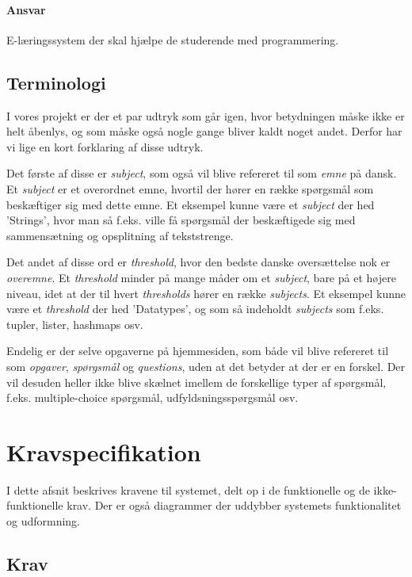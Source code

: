 \documentclass[11pt, a4paper]{article}
\begin{document}
\paragraph{Ansvar}
E-læringssystem der skal hjælpe de studerende med programmering.

\subsection{Terminologi}
\label{sub:terminologi}
I vores projekt er der et par udtryk som går igen, hvor betydningen måske ikke er helt åbenlys, og som måske også nogle gange bliver kaldt noget andet. Derfor har vi lige en kort forklaring af disse udtryk.

Det første af disse er \emph{subject}, som også vil blive refereret til som \emph{emne} på dansk. Et \emph{subject} er et overordnet emne, hvortil der hører en række spørgsmål som beskæftiger sig med dette emne. Et eksempel kunne være et \emph{subject} der hed 'Strings', hvor man så f.eks. ville få spørgsmål der beskæftigede sig med sammensætning og opsplitning af tekststrenge.

Det andet af disse ord er \emph{threshold}, hvor den bedste danske oversættelse nok er \emph{overemne}. Et \emph{threshold} minder på mange måder om et \emph{subject}, bare på et højere niveau, idet at der til hvert \emph{thresholds} hører en række \emph{subjects}. Et eksempel kunne være et \emph{threshold} der hed 'Datatypes', og som så indeholdt \emph{subjects} som f.eks. tupler, lister, hashmaps osv.

Endelig er der selve opgaverne på hjemmesiden, som både vil blive refereret til som \emph{opgaver}, \emph{spørgsmål} og \emph{questions}, uden at det betyder at der er en forskel. Der vil desuden heller ikke blive skælnet imellem de forskellige typer af spørgsmål, f.eks. multiple-choice spørgsmål, udfyldsningsspørgsmål osv.

\section{Kravspecifikation}
\label{sec:kravspecifikation}
I dette afsnit beskrives kravene til systemet, delt op i de funktionelle og de ikke-funktionelle krav. Der er også diagrammer der uddybber systemets funktionalitet og udformning.

\subsection{Krav}
\label{sub:krav}
\end{document}

